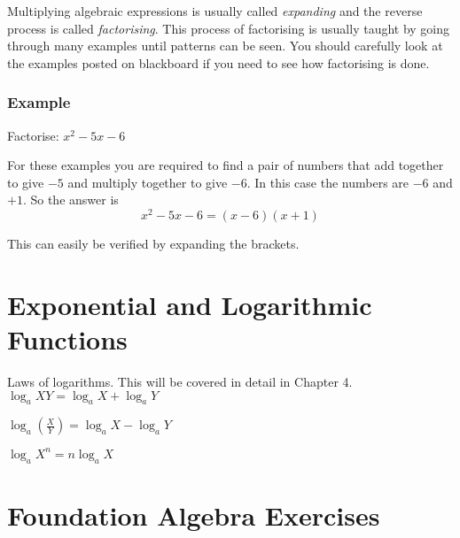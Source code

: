  Multiplying algebraic expressions is usually called \emph{expanding}
 and the reverse process is called \emph{factorising}. This process of factorising is usually
 taught by going through many examples until patterns can be seen. You should carefully look at the examples posted on blackboard if you need to see how factorising is done. 
 
 \subsubsection{Example}
 Factorise: $x^{2} -5 x -6$ 
 
 For these examples you are required to find a pair of numbers that add together to give $ -5$ and multiply together to give $ -6$. In this case the numbers are $ -6$ and $ +1$. So the answer is
 \begin{equation*}x^{2} -5 x -6 =\left (x -6\right ) \left (x +1\right )
 \end{equation*}
 
 This can easily be verified by expanding the brackets. 
 \section{Exponential and Logarithmic Functions}
 Laws of logarithms. This will be covered in detail in Chapter 4.\\
 $\log _{a} X Y =\log _{a} X +\log _{a} Y$ 
 
 $\log _{a} \genfrac{(}{)}{}{}{X}{Y} =\log _{a} X -\log _{a} Y$ 
 
 $\log _{a} X^{n} =n \log _{a} X$ 
 
 
\section{Foundation Algebra Exercises} 
 
